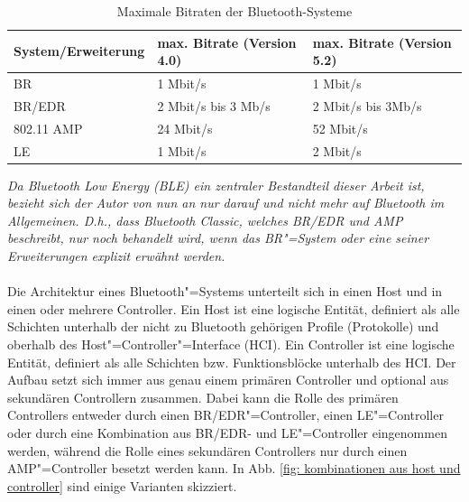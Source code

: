 \begin{table}[H]
    \begin{tabular}[h]{|l|l|l|}
    \hline
    \textbf{System/Erweiterung} & \textbf{max. Bitrate (Version 4.0)} & \textbf{max. Bitrate (Version 5.2)} \\
    \hline
    BR          & 1 Mbit/s \cite{BtSpec4.0_124}               & 1 Mbit/s \cite{BtSpec5.2_188}           \\
    \hline
    BR/EDR      & 2 Mbit/s bis 3 Mb/s \cite{BtSpec4.0_124}    & 2 Mbit/s bis 3Mb/s \cite{BtSpec5.2_188} \\
    \hline
    802.11 AMP  & 24 Mbit/s \cite{BtSpec4.0_123}              & 52 Mbit/s \cite{BtSpec5.2_187}          \\
    \hline
    LE          & 1 Mbit/s \cite{BtSpec4.0_126}               & 2 Mbit/s \cite{BtSpec5.2_190}           \\
    \hline
    \end{tabular}
    \caption[Maximale Bitraten der Bluetooth-Systeme]{Maximale Bitraten der Bluetooth-Systeme}
    \label{tab: maximale Bitraten BT}
\end{table}
\textit{Da Bluetooth Low Energy (BLE) ein zentraler Bestandteil dieser Arbeit ist, bezieht sich der Autor von nun an nur darauf und nicht mehr auf Bluetooth im Allgemeinen. D.h., dass Bluetooth Classic, welches BR/EDR und AMP beschreibt, nur noch behandelt wird, wenn das BR"=System oder eine seiner Erweiterungen explizit erwähnt werden.}
\\\\
Die Architektur eines Bluetooth"=Systems unterteilt sich in einen Host und in einen oder mehrere Controller. Ein Host ist eine logische Entität, definiert als alle Schichten unterhalb der nicht zu Bluetooth gehörigen Profile (Protokolle) und oberhalb des Host"=Controller"=Interface (HCI). Ein Controller ist eine logische Entität, definiert als alle Schichten bzw. Funktionsblöcke unterhalb des HCI. Der Aufbau setzt sich immer aus genau einem primären Controller und optional aus sekundären Controllern zusammen. Dabei kann die Rolle des primären Controllers entweder durch einen BR/EDR"=Controller, einen LE"=Controller oder durch eine Kombination aus BR/EDR- und LE"=Controller eingenommen werden, während die Rolle eines sekundären Controllers nur durch einen AMP"=Controller besetzt werden kann. In Abb. \ref{fig: kombinationen aus host und controller} sind einige Varianten skizziert. 
